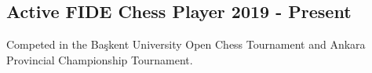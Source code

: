 \documentclass[a4paper,12pt]{article}
\begin{document}
\vspace*{1pt}
\subsection{{Active FIDE Chess Player }\hfill 2019 - Present}
\begin{zitemize}
\item Competed in the Başkent University Open Chess Tournament and Ankara Provincial Championship Tournament.
\end{zitemize}
\end{document}
